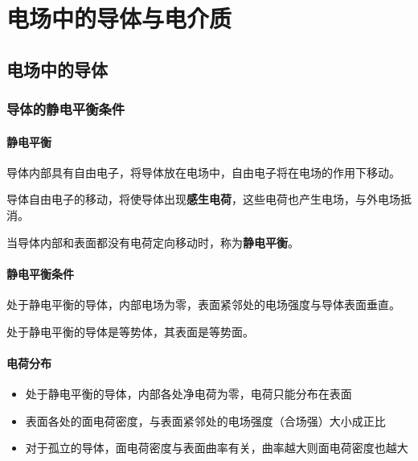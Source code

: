\chapter{电场中的导体与电介质}
\setcounter{example_counter}{1}

\section{电场中的导体}

\subsection{导体的静电平衡条件}

\subsubsection{静电平衡}

导体内部具有自由电子，将导体放在电场中，自由电子将在电场的作用下移动。

导体自由电子的移动，将使导体出现\textbf{感生电荷}，这些电荷也产生电场，与外电场抵消。

当导体内部和表面都没有电荷定向移动时，称为\textbf{静电平衡}。

\subsubsection{静电平衡条件}

处于静电平衡的导体，内部电场为零，表面紧邻处的电场强度与导体表面垂直。

处于静电平衡的导体是等势体，其表面是等势面。


\subsubsection{电荷分布}

\begin{itemize}
    \item 处于静电平衡的导体，内部各处净电荷为零，电荷只能分布在表面
    \item 表面各处的面电荷密度，与表面紧邻处的电场强度（合场强）大小成正比
    \item 对于孤立的导体，面电荷密度与表面曲率有关，曲率越大则面电荷密度也越大
\end{itemize}


